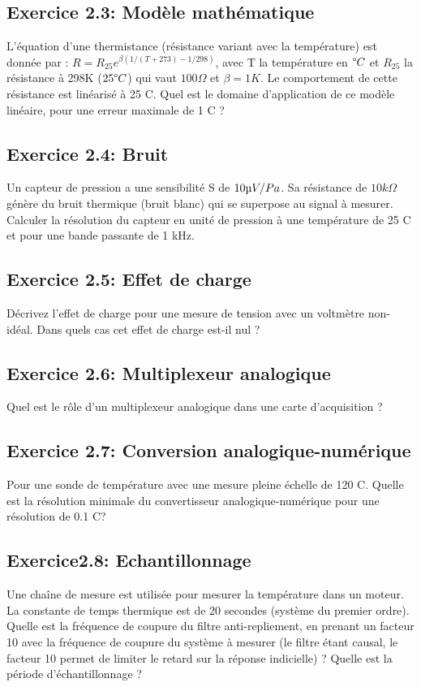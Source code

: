 \documentclass[main.tex]{subfiles}
\begin{document}
\subsection*{Exercice 2.3: Modèle mathématique}
L’équation d’une thermistance (résistance variant avec la température) est donnée par :
$ R=R_{25}  e^{\beta (1/(T+273) - 1/298)}$, avec T la température en $\degree C$ et $R_{25}$ la résistance à 298K ($25 \degree C$) qui vaut $100 \Omega$ et $\beta = 1 K$.
Le comportement de cette résistance est linéarisé à 25 \degree C. Quel est le domaine d’application de ce modèle linéaire, pour une erreur maximale de 1 \degree C ?

\subsection*{Exercice 2.4: Bruit}
Un capteur de pression a une sensibilité S de $10 \micro V/Pa$. Sa résistance de $10 k\Omega$ génère du bruit thermique (bruit blanc) qui se superpose au signal à mesurer.
Calculer la résolution du capteur en unité de pression à une température de 25 \degree C et pour une bande passante de 1 kHz.

\subsection*{Exercice 2.5: Effet de charge}
Décrivez l’effet de charge pour une mesure de tension avec un voltmètre non-idéal.
Dans quels cas cet effet de charge est-il nul ?

\subsection*{Exercice 2.6: Multiplexeur analogique}
Quel est le rôle d’un multiplexeur analogique dans une carte d’acquisition ? 

\subsection*{Exercice 2.7: Conversion analogique-numérique}

Pour une sonde de température avec une mesure pleine échelle de 120 \degre C. Quelle est la résolution minimale du convertisseur analogique-numérique pour une résolution de 0.1 \degree C?

\subsection*{Exercice2.8: Echantillonnage}
Une chaîne de mesure est utilisée pour mesurer la température dans un moteur. La constante de temps thermique est de 20 secondes (système du premier ordre).
Quelle est la fréquence de coupure du filtre anti-repliement, en prenant un facteur 10 avec la fréquence de coupure du système à mesurer (le filtre étant causal, le facteur 10 permet de limiter le retard sur la réponse indicielle) ?
Quelle est la période d’échantillonnage ?
\end{document}
